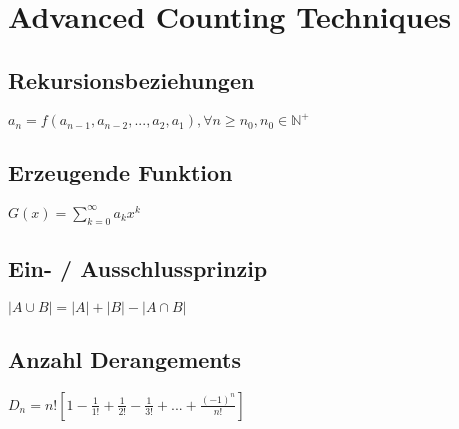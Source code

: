 \section{Advanced Counting Techniques}

\subsection{Rekursionsbeziehungen}
$ a_n = f(a_{n-1}, a_{n-2}, ..., a_2, a_1), \forall n \geq n_0, n_0 \in \mathbb{N}^+ $

\subsection{Erzeugende Funktion}
$ G(x) = \sum_{k=0}^\infty a_k x^k $

\subsection{Ein- / Ausschlussprinzip}
$ |A \cup B| = |A| + |B| - |A \cap B| $

\subsection{Anzahl Derangements}
$ D_n = n! [1 - \frac{1}{1!} + \frac{1}{2!} - \frac{1}{3!} + ... + \frac{(-1)^n}{n!}] $
